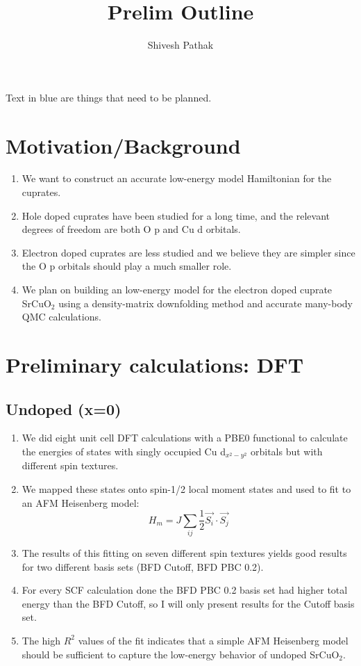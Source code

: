 \documentclass{article}
\title{Prelim Outline}
\author{Shivesh Pathak}
\begin{document}
\maketitle

Text in \color{blue} blue \color{black} are things that need to be planned.

\section{Motivation/Background}
\begin{enumerate}
\item We want to construct an accurate low-energy model Hamiltonian for the cuprates.
\item Hole doped cuprates have been studied for a long time, and the relevant degrees of freedom are both O p and Cu d orbitals. 
\item Electron doped cuprates are less studied and we believe they are simpler since the O p orbitals should play a much smaller role.
\item We plan on building an low-energy model for the electron doped cuprate SrCuO$_2$ using a density-matrix downfolding method and accurate many-body QMC calculations.
\end{enumerate}

\section{Preliminary calculations: DFT}
\subsection{Undoped (x=0)}
\begin{enumerate}
\item We did eight unit cell DFT calculations with a PBE0 functional to calculate the energies of states with singly occupied Cu d$_{x^2-y^2}$ orbitals but with different spin textures.

\item We mapped these states onto spin-1/2 local moment states and used to fit to an AFM Heisenberg model:
$$H_m = J\sum_{ij} \frac{1}{2} \vec{S_i}\cdot\vec{S_j} $$ 

\item The results of this fitting on seven different spin textures yields good results for two different basis sets (BFD Cutoff, BFD PBC 0.2).

\item For every SCF calculation done the BFD PBC 0.2 basis set had higher total energy than the BFD Cutoff, so I will only present results for the Cutoff basis set.

\item The high $R^2$ values of the fit indicates that a simple AFM Heisenberg model should be sufficient to capture the low-energy behavior of undoped SrCuO$_2$.
\end{enumerate}
\end{document}
